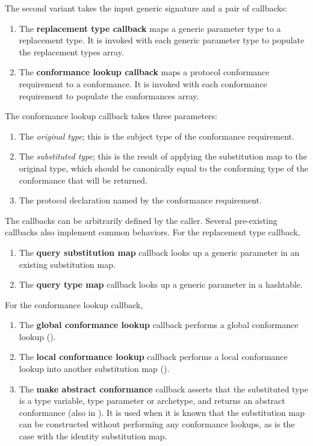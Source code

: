 \documentclass[../generics]{subfiles}
\begin{document}
The second variant takes the input generic signature and a pair of callbacks:
\begin{enumerate}
\item The \textbf{replacement type callback} maps a generic parameter type to a replacement type. It is invoked with each generic parameter type to populate the replacement types array.
\item The \textbf{conformance lookup callback} maps a protocol conformance requirement to a conformance. It is invoked with each conformance requirement to populate the conformances array.
\end{enumerate}
The conformance lookup callback takes three parameters:
\begin{enumerate}
\item The \emph{original type}; this is the subject type of the conformance requirement.
\item The \emph{substituted type}; this is the result of applying the substitution map to the original type, which should be canonically equal to the conforming type of the conformance that will be returned.
\item The protocol declaration named by the conformance requirement.
\end{enumerate}
The callbacks can be arbitrarily defined by the caller. Several pre-existing callbacks also implement common behaviors. For the replacement type callback,
\begin{enumerate}
\item The \textbf{query substitution map} callback looks up a generic parameter in an existing substitution map.
\item The \textbf{query type map} callback looks up a generic parameter in a hashtable.
\end{enumerate}
For the conformance lookup callback,
\begin{enumerate}
\item The \textbf{global conformance lookup} callback performs a global conformance lookup ().
\item The \textbf{local conformance lookup} callback performs a local conformance lookup into another substitution map ().
\item The \textbf{make abstract conformance} callback asserts that the substituted type is a type variable, type parameter or archetype, and returns an abstract conformance (also in ). It is used when it is known that the substitution map can be constructed without performing any conformance lookups, as is the case with the identity substitution map.
\end{enumerate}
\end{document}
